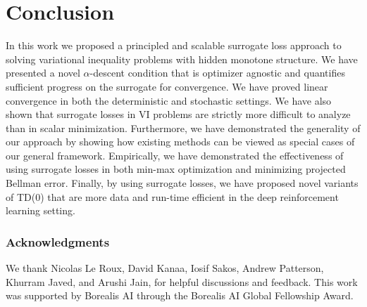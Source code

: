 \documentclass{article} %
\theoremstyle{definition}
\begin{document}
\section{Conclusion}

In this work we proposed a principled and scalable surrogate loss approach to solving variational inequality problems with hidden monotone structure.
We have presented a novel $\alpha$-descent condition that is optimizer agnostic and quantifies sufficient progress on the surrogate for convergence.  
We have proved linear convergence in both the deterministic and stochastic settings.  We have also shown that surrogate losses in VI problems are strictly more difficult to analyze than in scalar minimization. 
Furthermore, we have demonstrated the generality of our approach by showing how existing  methods can be viewed as special cases of our general framework.
Empirically, we have demonstrated the effectiveness of using surrogate losses in both min-max optimization and minimizing projected Bellman error. Finally, by using surrogate losses, we have proposed novel variants of TD(0) that are more data and run-time efficient in the deep reinforcement learning setting. 


\subsubsection*{Acknowledgments}
We thank Nicolas Le Roux, David Kanaa, Iosif Sakos, Andrew Patterson, Khurram Javed, and Arushi Jain, for helpful discussions
and feedback. This work was supported by Borealis AI through the Borealis AI
Global Fellowship Award.



\clearpage
\appendix
\end{document}
